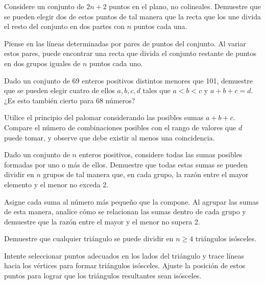 \documentclass[11pt]{scrartcl}
\begin{document}
\begin{problem}
Considere un conjunto de \(2n + 2\) puntos en el plano, no colineales. Demuestre que se pueden elegir dos de estos puntos de tal manera que la recta que los une divida el resto del conjunto en dos partes con \(n\) puntos cada una.
\begin{hint}
Piense en las líneas determinadas por pares de puntos del conjunto. Al variar estos pares, puede encontrar una recta que divida el conjunto restante de puntos en dos grupos iguales de \(n\) puntos cada uno.
\end{hint}
\end{problem}

\begin{problem}
Dado un conjunto de 69 enteros positivos distintos menores que 101, demuestre que se pueden elegir cuatro de ellos \(a, b, c, d\) tales que \(a < b < c\) y \(a + b + c = d\). ¿Es esto también cierto para 68 números?
\begin{hint}
Utilice el principio del palomar considerando las posibles sumas \(a + b + c\). Compare el número de combinaciones posibles con el rango de valores que \(d\) puede tomar, y observe que debe existir al menos una coincidencia.
\end{hint}
\end{problem}

\begin{problem}[USAMO 1996] Dado un conjunto de \(n\) enteros positivos, considere todas las sumas posibles formadas por uno o más de ellos. Demuestre que todas estas sumas se pueden dividir en \(n\) grupos de tal manera que, en cada grupo, la razón entre el mayor elemento y el menor no exceda 2.
\begin{hint}
Asigne cada suma al número más pequeño que la compone. Al agrupar las sumas de esta manera, analice cómo se relacionan las sumas dentro de cada grupo y demuestre que la razón entre el mayor y el menor no supera 2.
\end{hint}
\end{problem}

\begin{problem}
Demuestre que cualquier triángulo se puede dividir en \(n \geq 4\) triángulos isósceles.
\begin{hint}
Intente seleccionar puntos adecuados en los lados del triángulo y trace líneas hacia los vértices para formar triángulos isósceles. Ajuste la posición de estos puntos para lograr que los triángulos resultantes sean isósceles.
\end{hint}
\end{problem}
\end{document}

